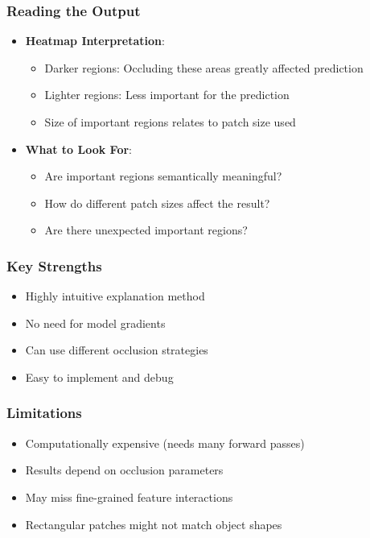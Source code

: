 \documentclass{article}
\begin{document}
\subsubsection{Reading the Output}
\begin{itemize}
    \item \textbf{Heatmap Interpretation}:
        \begin{itemize}
            \item Darker regions: Occluding these areas greatly affected prediction
            \item Lighter regions: Less important for the prediction
            \item Size of important regions relates to patch size used
        \end{itemize}
    \item \textbf{What to Look For}:
        \begin{itemize}
            \item Are important regions semantically meaningful?
            \item How do different patch sizes affect the result?
            \item Are there unexpected important regions?
        \end{itemize}
\end{itemize}

\subsubsection{Key Strengths}
\begin{itemize}
    \item Highly intuitive explanation method
    \item No need for model gradients
    \item Can use different occlusion strategies
    \item Easy to implement and debug
\end{itemize}

\subsubsection{Limitations}
\begin{itemize}
    \item Computationally expensive (needs many forward passes)
    \item Results depend on occlusion parameters
    \item May miss fine-grained feature interactions
    \item Rectangular patches might not match object shapes
\end{itemize}
\end{document}
